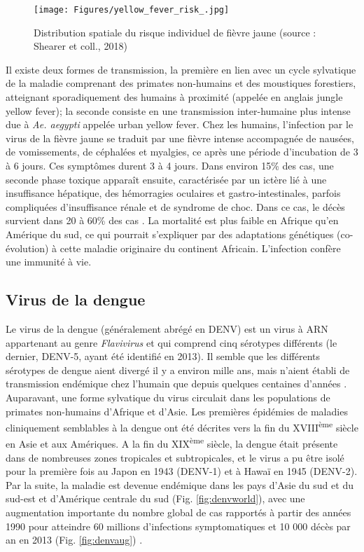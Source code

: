 \begin{figure}[t]
	\centering
	\texttt{[image: Figures/yellow\_fever\_risk\_.jpg]}
	\caption{Distribution spatiale du risque individuel de fièvre jaune (source : Shearer et coll., 2018)}
	\label{fig:yfworld}
\end{figure}

Il existe deux formes de transmission, la première en lien avec un cycle sylvatique de la maladie comprenant des primates non-humains et des moustiques forestiers, atteignant sporadiquement des humains à proximité (appelée en anglais \guillemotleft jungle yellow fever\guillemotright); la seconde consiste en une transmission inter-humaine plus intense due à {\em Ae. aegypti} appelée \guillemotleft urban yellow fever\guillemotright \cite{monath2015yellow}.
Chez les humains, l'infection par le virus de la fièvre jaune se traduit par une fièvre intense accompagnée de nausées, de vomissements, de céphalées et myalgies, ce après une période d'incubation de 3 à 6 jours.
Ces symptômes durent 3 à 4 jours.
Dans environ 15\% des cas, une seconde phase toxique apparaît ensuite, caractérisée par un ictère lié à une insuffisance hépatique, des hémorragies oculaires et gastro-intestinales, parfois compliquées d'insuffisance rénale et de syndrome de choc.
Dans ce cas, le décès survient dans 20 à 60\% des cas \cite{monath2015yellow}.
La mortalité est plus faible en Afrique qu'en Amérique du sud, ce qui pourrait s'expliquer par des adaptations génétiques (\guillemotleft co-évolution\guillemotright) à cette maladie originaire du continent Africain.
L'infection confère une immunité à vie.



\subsection{Virus de la dengue}
\label{sec:dengue}

Le virus de la dengue (généralement abrégé en DENV) est un virus à ARN appartenant au genre {\em Flavivirus} et qui comprend cinq sérotypes différents (le dernier, DENV-5, ayant été identifié en 2013).
Il semble que les différents sérotypes de dengue aient divergé il y a environ mille ans, mais n'aient établi de transmission endémique chez l'humain que depuis quelques centaines d'années \cite{holmes2003origin}.
Auparavant, une forme sylvatique du virus circulait dans les populations de primates non-humains d'Afrique et d'Asie.
Les premières épidémies de maladies cliniquement semblables à la dengue ont été décrites vers la fin du XVIII\textsuperscript{ème} siècle en Asie et aux Amériques.
A la fin du XIX\textsuperscript{ème} siècle, la dengue était présente dans de nombreuses zones tropicales et subtropicales, et le virus a pu être isolé pour la première fois au Japon en 1943 (DENV-1) et à Hawaï en 1945 (DENV-2).
Par la suite, la maladie est devenue endémique dans les pays d'Asie du sud et du sud-est et d'Amérique centrale du sud (Fig. \ref{fig:denvworld}), avec une augmentation importante du nombre global de cas rapportés à partir des années 1990 pour atteindre 60 millions d'infections symptomatiques et 10 000 décès par an en 2013 (Fig. \ref{fig:denvaug})  \cite{messina2014global,stanaway2016global,bhatt2013global}.


